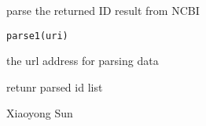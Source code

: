 \begin{Description}\relax
parse the returned ID result from NCBI
\end{Description}
\begin{Usage}
\begin{verbatim}
parse1(uri)
\end{verbatim}
\end{Usage}
\begin{Arguments}
\begin{ldescription}
\item[\code{uri}] the url address for parsing data
\end{ldescription}
\end{Arguments}
\begin{Value}
retunr parsed id list
\end{Value}
\begin{Author}\relax
Xiaoyong Sun
\end{Author}

